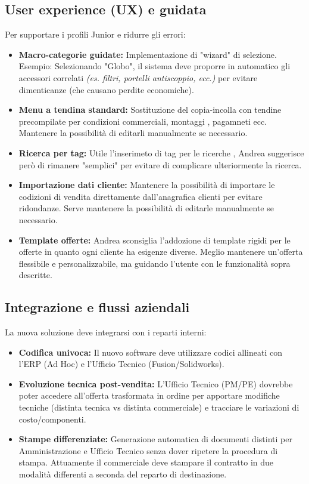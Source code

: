 \documentclass[12pt, a4paper]{article} %
\begin{document}
\subsection{User experience (UX) e guidata}
Per supportare i profili Junior e ridurre gli errori:
\begin{itemize}
    \item \textbf{Macro-categorie guidate:} Implementazione di "wizard" di selezione. Esempio: Selezionando "Globo", il sistema deve proporre in automatico gli accessori correlati
          \textit{(es. filtri, portelli antiscoppio, ecc.)} per evitare dimenticanze (che causano perdite economiche).
    \item \textbf{Menu a tendina standard:} Sostituzione del copia-incolla con tendine precompilate per condizioni commerciali, montaggi , pagamneti ecc.
          Mantenere la possibilità di editarli manualmente se necessario.
    \item \textbf{Ricerca per tag:} Utile l'inserimeto di tag per le ricerche , Andrea suggerisce però di rimanere "semplici" per evitare di complicare ulteriormente la ricerca.
    \item \textbf{Importazione dati cliente:} Mantenere la possibilità di importare le codizioni di vendita direttamente dall'anagrafica clienti per evitare ridondanze.
          Serve mantenere la possibilità di editarle manualmente se necessario.
    \item \textbf{Template offerte:} Andrea sconsiglia l'addozione di template rigidi per le offerte in quanto ogni cliente ha esigenze diverse.
          Meglio mantenere un'offerta flessibile e personalizzabile, ma guidando l'utente con le funzionalità sopra descritte.
\end{itemize}

\subsection{Integrazione e flussi aziendali}
La nuova soluzione deve integrarsi con i reparti interni:
\begin{itemize}
    \item \textbf{Codifica univoca:} Il nuovo software deve utilizzare codici allineati con l'ERP (Ad Hoc) e l'Ufficio Tecnico (Fusion/Solidworks).
    \item \textbf{Evoluzione tecnica post-vendita:} L'Ufficio Tecnico (PM/PE) dovrebbe poter accedere all'offerta trasformata in ordine per apportare modifiche tecniche (distinta tecnica vs distinta commerciale) e tracciare le variazioni di costo/componenti.
    \item \textbf{Stampe differenziate:} Generazione automatica di documenti distinti per Amministrazione e Ufficio Tecnico senza dover ripetere la procedura di stampa.
          Attuamente il commerciale deve stampare il contratto in due modalità differenti a seconda del reparto di destinazione.
\end{itemize}
\end{document}
